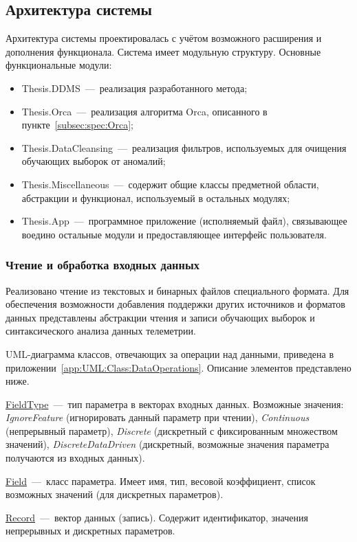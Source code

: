 \subsection{Архитектура системы}
Архитектура системы проектировалась с учётом возможного расширения и дополнения функционала. Система имеет модульную структуру. Основные функциональные модули:
\begin{itemize}
	\item Thesis.DDMS~---~реализация разработанного метода;
	\item Thesis.Orca~---~реализация алгоритма Orca, описанного в пункте~\ref{subsec:spec:Orca};
	\item Thesis.DataCleansing~---~реализация фильтров, используемых для очищения обучающих выборок от аномалий;
	\item Thesis.Miscellaneous~---~содержит общие классы предметной области, абстракции и функционал, используемый в остальных модулях;
	\item Thesis.App~---~программное приложение (исполняемый файл), связывающее воедино остальные модули и предоставляющее интерфейс пользователя.
\end{itemize}

\subsubsection{Чтение и обработка входных данных}
Реализовано чтение из текстовых и бинарных файлов специального формата. Для обеспечения возможности добавления поддержки других источников и форматов данных представлены абстракции чтения и записи обучающих выборок и синтаксического анализа данных телеметрии.

UML-диаграмма классов, отвечающих за операции над данными, приведена в приложении~\ref{app:UML:Class:DataOperations}. Описание элементов представлено ниже.

\uline{FieldType}~---~тип параметра в векторах входных данных. Возможные значения: \textit{IgnoreFeature} (игнорировать данный параметр при чтении), \textit{Continuous} (непрерывный параметр), \textit{Discrete} (дискретный с фиксированным множеством значений), \textit{DiscreteDataDriven} (дискретный, возможные значения параметра получаются из входных данных).

\uline{Field}~---~класс параметра. Имеет имя, тип, весовой коэффициент, список возможных значений (для дискретных параметров).

\uline{Record}~---~вектор данных (запись). Содержит идентификатор, значения непрерывных и дискретных параметров.

